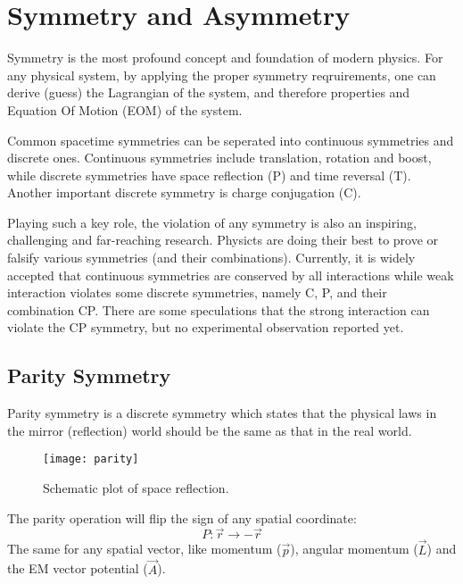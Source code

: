\section{Symmetry and Asymmetry}
Symmetry is the most profound concept and foundation of modern physics. For any
physical system, by applying the proper symmetry reqruirements, one can derive 
(guess) the Lagrangian of the system, and therefore properties and Equation Of Motion (EOM)
of the system.

Common spacetime symmetries can be seperated into continuous symmetries 
and discrete ones. Continuous symmetries include translation, rotation and
boost, while discrete symmetries have space reflection (P) and time reversal (T).
Another important discrete symmetry is charge conjugation (C).

Playing such a key role, the violation of any symmetry is also an inspiring, challenging
and far-reaching research. Physicts are doing their best to prove or falsify various
symmetries (and their combinations). Currently, it is widely accepted that continuous
symmetries are conserved by all interactions while weak interaction violates
some discrete symmetries, namely C, P, and their combination CP. There are some
speculations that the strong interaction can violate the CP symmetry, but no
experimental observation reported yet.

\subsection{Parity Symmetry}
Parity symmetry is a discrete symmetry which states that the physical laws in
the mirror (reflection) world should be the same as that in the real world. 
\begin{figure}[H]
    \centering
    \texttt{[image: parity]}
    \caption{Schematic plot of space reflection.}
\end{figure}

The parity operation will flip the sign of any spatial coordinate:
\begin{equation}
    P: \vec{r} \rightarrow -\vec{r}
\end{equation}
The same for any spatial vector, like momentum ($\vec{p}$), angular momentum ($\vec{L}$)
and the EM vector potential ($\vec{A}$).

